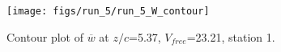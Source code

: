 \begin{figure}[H]
\centering
\texttt{[image: figs/run\_5/run\_5\_W\_contour]}
\caption{Contour plot of $\overline{w}$ at $z/c$=5.37, $V_{free}$=23.21, station 1.}
\label{fig:run_5_W_contour}
\end{figure}


